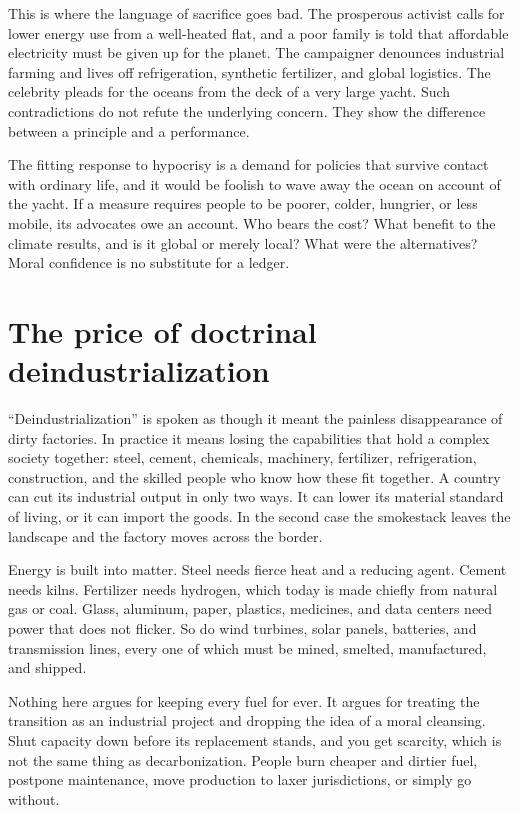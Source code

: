 \documentclass[12pt,a4paper]{book}
\begin{document}
This is where the language of sacrifice goes bad. The prosperous activist calls for lower energy use from a well-heated flat, and a poor family is told that affordable electricity must be given up for the planet. The campaigner denounces industrial farming and lives off refrigeration, synthetic fertilizer, and global logistics. The celebrity pleads for the oceans from the deck of a very large yacht. Such contradictions do not refute the underlying concern. They show the difference between a principle and a performance.

The fitting response to hypocrisy is a demand for policies that survive contact with ordinary life, and it would be foolish to wave away the ocean on account of the yacht. If a measure requires people to be poorer, colder, hungrier, or less mobile, its advocates owe an account. Who bears the cost? What benefit to the climate results, and is it global or merely local? What were the alternatives? Moral confidence is no substitute for a ledger.

\section{The price of doctrinal deindustrialization}

``Deindustrialization'' is spoken as though it meant the painless disappearance of dirty factories. In practice it means losing the capabilities that hold a complex society together: steel, cement, chemicals, machinery, fertilizer, refrigeration, construction, and the skilled people who know how these fit together. A country can cut its industrial output in only two ways. It can lower its material standard of living, or it can import the goods. In the second case the smokestack leaves the landscape and the factory moves across the border.

Energy is built into matter. Steel needs fierce heat and a reducing agent. Cement needs kilns. Fertilizer needs hydrogen, which today is made chiefly from natural gas or coal. Glass, aluminum, paper, plastics, medicines, and data centers need power that does not flicker. So do wind turbines, solar panels, batteries, and transmission lines, every one of which must be mined, smelted, manufactured, and shipped.

Nothing here argues for keeping every fuel for ever. It argues for treating the transition as an industrial project and dropping the idea of a moral cleansing. Shut capacity down before its replacement stands, and you get scarcity, which is not the same thing as decarbonization. People burn cheaper and dirtier fuel, postpone maintenance, move production to laxer jurisdictions, or simply go without.
\end{document}
